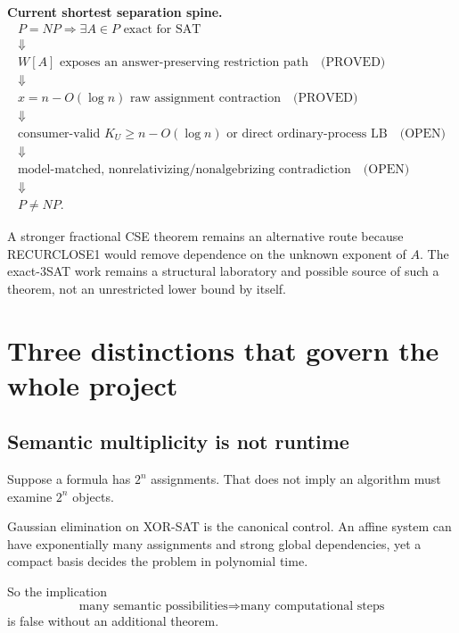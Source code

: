 \documentclass[11pt]{article}
\theoremstyle{plain}
\theoremstyle{definition}
\theoremstyle{remark}
\begin{document}
\begin{candidatebox}
\textbf{Current shortest separation spine.}
\[
\boxed{
\begin{array}{c}
P=NP
\Rightarrow
\exists A\in P\text{ exact for SAT}\\
\Downarrow\\
W[A]\text{ exposes an answer-preserving restriction path}
\quad\text{(PROVED)}\\
\Downarrow\\
x=n-O(\log n)\text{ raw assignment contraction}
\quad\text{(PROVED)}\\
\Downarrow\\
\text{consumer-valid }K_U\ge n-O(\log n)
\text{ or direct ordinary-process LB}
\quad\text{(OPEN)}\\
\Downarrow\\
\text{model-matched, nonrelativizing/nonalgebrizing contradiction}
\quad\text{(OPEN)}\\
\Downarrow\\
P\ne NP.
\end{array}}
\]
\end{candidatebox}

A stronger fractional CSE theorem remains an alternative route because
RECURCLOSE1 would remove dependence on the unknown exponent of \(A\).
The exact-3SAT work remains a structural laboratory and possible source of
such a theorem, not an unrestricted lower bound by itself.

\section{Three distinctions that govern the whole project}

\subsection{Semantic multiplicity is not runtime}

Suppose a formula has \(2^n\) assignments.  That does not imply an algorithm
must examine \(2^n\) objects.

Gaussian elimination on XOR-SAT is the canonical control.  An affine system
can have exponentially many assignments and strong global dependencies, yet a
compact basis decides the problem in polynomial time.

So the implication
\[
\text{many semantic possibilities}
\Longrightarrow
\text{many computational steps}
\]
is false without an additional theorem.
\end{document}
